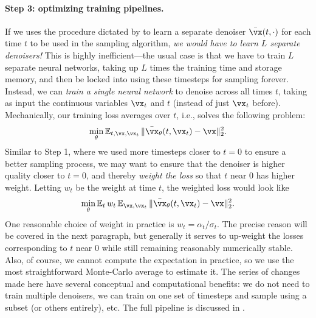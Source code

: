 \documentclass[../../book-main.tex]{subfiles}
\begin{document}
\paragraph{Step 3: optimizing training pipelines.} If we uses the procedure dictated by  to learn a separate denoiser \(\bar{\vx}(t, \cdot)\) for each time \(t\) to be used in the sampling algorithm, \textit{we would have to learn \(L\) separate denoisers!} This is highly inefficient---the usual case is that we have to train \(L\) separate neural networks, taking up \(L\) times the training time and storage memory, and then be locked into using these timesteps for sampling forever. Instead, we can \textit{train a single neural network} to denoise across all times \(t\), taking as input the continuous variables \(\vx_{t}\) and \(t\) (instead of just \(\vx_{t}\) before). Mechanically, our training loss averages over \(t\), i.e., solves the following problem:
\begin{equation}
	\min_{\theta}\Ex_{t, \vx, \vx_{t}}\norm{\bar{\vx}_{\theta}(t, \vx_{t}) - \vx}_{2}^{2}.
\end{equation}
Similar to Step 1, where we used more timesteps closer to \(t = 0\) to ensure a better sampling process, we may want to ensure that the denoiser is higher quality closer to \(t = 0\), and thereby \textit{weight the loss} so that \(t\) near \(0\) has higher weight. Letting \(w_{t}\) be the weight at time \(t\), the weighted loss would look like
\begin{equation}\label{eq:parametric_denoising_loss}
	\min_{\theta}\Ex_{t}w_{t}\Ex_{\vx, \vx_{t}}\norm{\bar{\vx}_{\theta}(t, \vx_{t}) - \vx}_{2}^{2}.
\end{equation}
One reasonable choice of weight in practice is \(w_{t} = \alpha_{t}/\sigma_{t}\). The precise reason will be covered in the next paragraph, but generally it serves to up-weight the losses corresponding to \(t\) near \(0\) while still remaining reasonably numerically stable. Also, of course, we cannot compute the expectation in practice, so we use the most straightforward Monte-Carlo average to estimate it. The series of changes made here have several conceptual and computational benefits: we do not need to train multiple denoisers, we can train on one set of timesteps and sample using a subset (or others entirely), etc. The full pipeline is discussed in .
\end{document}
